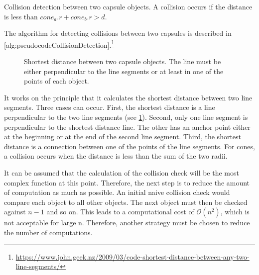 \begin{lstfloat}[!t]
\caption{Collision detection between two capsule objects. A collision occurs if the distance is less than $\mathit{cone_a.r}+\mathit{cone_b.r} > d$.}
\label{alg:pseudocodeCollisionDetection}
\end{lstfloat}
% 
The algorithm for detecting collisions between two capsules is described in \cref{alg:pseudocodeCollisionDetection}.\footnote{\href{https://www.john.geek.nz/2009/03/code-shortest-distance-between-any-two-line-segments/}{https://www.john.geek.nz/2009/03/code-shortest-distance-between-any-two-line-segments/}}
%
\begin{figure}[!t]
    \centering
    \def\tikzheight{0.5\textwidth}
	\caption{Shortest distance between two capsule objects. The line must be either perpendicular to the line segments or at least in one of the points of each object.}
	\label{fig:shortDist}
\end{figure}
%
It works on the principle that it calculates the shortest distance between two line segments.
Three cases can occur.
First, the shortest distance is a line perpendicular to the two line segments (see \cref{fig:shortDist}).
Second, only one line segment is perpendicular to the shortest distance line.
The other has an anchor point either at the beginning or at the end of the second line segment.
Third, the shortest distance is a connection between one of the points of the line segments.
For cones, a collision occurs when the distance is less than the sum of the two radii.
\par
% 
It can be assumed that the calculation of the collision check will be the most complex function at this point.
Therefore, the next step is to reduce the amount of computation as much as possible.
An initial naive collision check would compare each object to all other objects.
The next object must then be checked against $n-1$ and so on.
This leads to a computational cost of $\mathcal{O}(n^{2})$, which is not acceptable for large n.
Therefore, another strategy must be chosen to reduce the number of computations.
%
% 
% 

